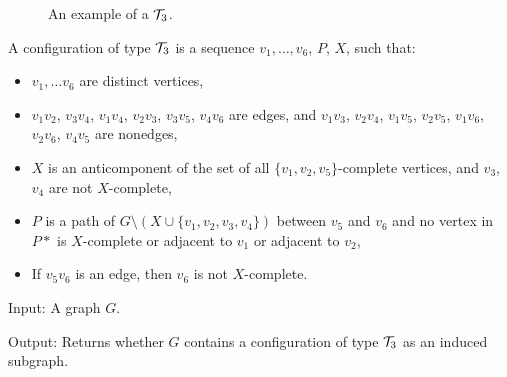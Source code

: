 \begin{wrapfigure}{r}{0.35\textwidth}
	\vspace{-1cm}
	
	\caption{An example of a $\mathcal{T}_3$.}%
	\vspace{-2cm}
\end{wrapfigure}

A configuration of type $\mathcal{T}_3$ is a sequence $v_1, \ldots, v_6$, $P$, $X$, such that:
\begin{itemize}
	\item $v_1, \ldots v_6$ are distinct vertices,
	\item $v_1v_2$, $v_3v_4$, $v_1v_4$, $v_2v_3$, $v_3v_5$, $v_4v_6$ are edges, and $v_1v_3$, $v_2v_4$, $v_1v_5$, $v_2v_5$, $v_1v_6$, $v_2v_6$, $v_4v_5$ are nonedges,
	\item $X$ is an anticomponent of the set of all $\{v_1, v_2, v_5\}$-complete vertices, and $v_3$, $v_4$ are not $X$-complete,
	\item $P$ is a path of $G \setminus ( X \cup \{v_1, v_2, v_3, v_4\} )$ between $v_5$ and $v_6$ and no vertex in $P*$ is $X$-complete or adjacent to $v_1$ or adjacent to $v_2$,
	\item If $v_5v_6$ is an edge, then $v_6$ is not $X$-complete.
\end{itemize}


\begin{alg}
	\label{alg:t3}
	Input: A graph $G$.

	\noindent Output: Returns whether $G$ contains a configuration of type $\mathcal{T}_3$ as an induced subgraph.
\end{alg}

